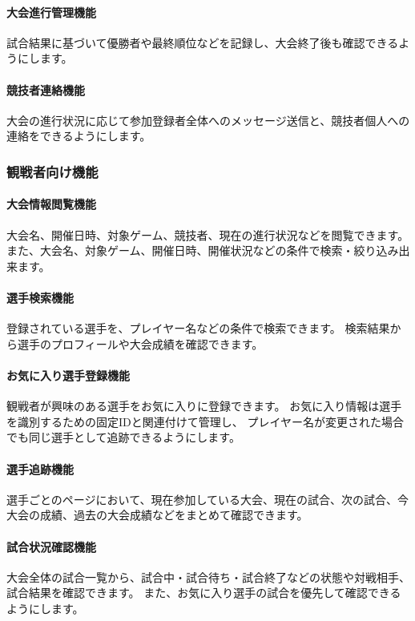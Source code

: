 \paragraph{大会進行管理機能}
試合結果に基づいて優勝者や最終順位などを記録し、大会終了後も確認できるようにします。

\paragraph{競技者連絡機能}
大会の進行状況に応じて参加登録者全体へのメッセージ送信と、競技者個人への連絡をできるようにします。

\subsubsection{観戦者向け機能}

\paragraph{大会情報閲覧機能}
大会名、開催日時、対象ゲーム、競技者、現在の進行状況などを閲覧できます。
また、大会名、対象ゲーム、開催日時、開催状況などの条件で検索・絞り込み出来ます。

\paragraph{選手検索機能}
登録されている選手を、プレイヤー名などの条件で検索できます。
検索結果から選手のプロフィールや大会成績を確認できます。

\paragraph{お気に入り選手登録機能}
観戦者が興味のある選手をお気に入りに登録できます。
お気に入り情報は選手を識別するための固定IDと関連付けて管理し、
プレイヤー名が変更された場合でも同じ選手として追跡できるようにします。

\paragraph{選手追跡機能}
選手ごとのページにおいて、現在参加している大会、現在の試合、次の試合、今大会の成績、過去の大会成績などをまとめて確認できます。

\paragraph{試合状況確認機能}
大会全体の試合一覧から、試合中・試合待ち・試合終了などの状態や対戦相手、試合結果を確認できます。
また、お気に入り選手の試合を優先して確認できるようにします。

